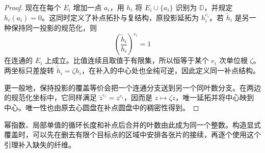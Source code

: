 \begin{proof}
	现在在每个 \(E_i\) 增加一点 \(a_i\)，用 \(h_i\) 将 \(E_i\cup\{a_i\}\) 识别为 \(\mathbb D\)，并规定 \(h_i(a_i)=0\)。这同时定义了补点拓扑与复结构，原投影延拓为 \(h_i^{e_i}\)。若 \(\widetilde h_i\) 是另一种保持同一投影的规范化，则
	\[
		\left(\frac{\widetilde h_i}{h_i}\right)^{e_i}=1
	\]
	在连通的 \(E_i\) 上成立。比值连续且取值于有限集，所以恒等于某个 \(e_i\) 次单位根 \(\zeta\)。两坐标只差旋转 \(\widetilde h_i=\zeta h_i\)，在补入的中心处也全纯可逆，因此定义同一补点结构。

	更一般地，保持投影的覆盖等价会把一个连通分支送到另一个同叶数分支。在两边的规范化坐标中，它同样满足 \(\widetilde z^{e_i}=z^{e_i}\)，因而是 \(z\mapsto\zeta z\)，唯一延拓并将中心映到中心。唯一性也由原去心圆盘在补点圆盘中的稠密性得到。
\end{proof}

幂指数、局部单值的循环长度和补点后合并的叶数由此成为同一个整数。构造显式覆盖时，可以先在删去有限个目标点的区域中安排各张片的接续，再逐个使用这个引理补入缺失的纤维。
